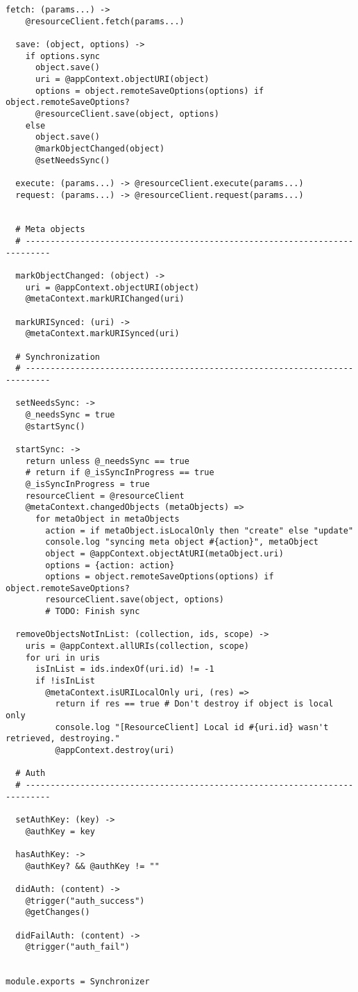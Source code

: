\begin{lstlisting}[caption=synchronizer.coffee]
  fetch: (params...) ->
    @resourceClient.fetch(params...)
  
  save: (object, options) ->
    if options.sync
      object.save()
      uri = @appContext.objectURI(object)
      options = object.remoteSaveOptions(options) if object.remoteSaveOptions?
      @resourceClient.save(object, options)
    else
      object.save()
      @markObjectChanged(object)
      @setNeedsSync()
  
  execute: (params...) -> @resourceClient.execute(params...)
  request: (params...) -> @resourceClient.request(params...)
    

  # Meta objects
  # ---------------------------------------------------------------------------
  
  markObjectChanged: (object) ->
    uri = @appContext.objectURI(object)
    @metaContext.markURIChanged(uri)
  
  markURISynced: (uri) ->
    @metaContext.markURISynced(uri)
  
  # Synchronization
  # ---------------------------------------------------------------------------

  setNeedsSync: ->
    @_needsSync = true
    @startSync()
  
  startSync: ->
    return unless @_needsSync == true
    # return if @_isSyncInProgress == true
    @_isSyncInProgress = true
    resourceClient = @resourceClient
    @metaContext.changedObjects (metaObjects) =>
      for metaObject in metaObjects
        action = if metaObject.isLocalOnly then "create" else "update"
        console.log "syncing meta object #{action}", metaObject
        object = @appContext.objectAtURI(metaObject.uri)
        options = {action: action}
        options = object.remoteSaveOptions(options) if object.remoteSaveOptions?
        resourceClient.save(object, options)
        # TODO: Finish sync
  
  removeObjectsNotInList: (collection, ids, scope) ->
    uris = @appContext.allURIs(collection, scope)
    for uri in uris
      isInList = ids.indexOf(uri.id) != -1
      if !isInList
        @metaContext.isURILocalOnly uri, (res) =>
          return if res == true # Don't destroy if object is local only
          console.log "[ResourceClient] Local id #{uri.id} wasn't retrieved, destroying."
          @appContext.destroy(uri)
    
  # Auth
  # ---------------------------------------------------------------------------  
  
  setAuthKey: (key) ->
    @authKey = key

  hasAuthKey: ->
    @authKey? && @authKey != ""

  didAuth: (content) ->
    @trigger("auth_success")
    @getChanges()

  didFailAuth: (content) ->
    @trigger("auth_fail")


module.exports = Synchronizer
\end{lstlisting}

